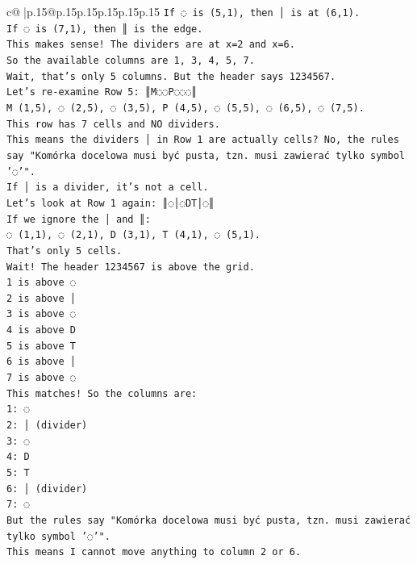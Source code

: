 \documentclass{article}
\begin{document}
{\begin{supertabular}{c@{$\;$}|p{.15\linewidth}@{}p{.15\linewidth}p{.15\linewidth}p{.15\linewidth}p{.15\linewidth}p{.15\linewidth}}
{{{\texttt{If ◌ is (5,1), then │ is at (6,1).} \\
\texttt{If ◌ is (7,1), then ║ is the edge.} \\
\texttt{This makes sense! The dividers are at x=2 and x=6.} \\
\texttt{So the available columns are 1, 3, 4, 5, 7.} \\
\texttt{Wait, that's only 5 columns. But the header says 1234567.} \\
\texttt{Let's re{-}examine Row 5: ║M◌◌P◌◌◌║} \\
\texttt{M (1,5), ◌ (2,5), ◌ (3,5), P (4,5), ◌ (5,5), ◌ (6,5), ◌ (7,5).} \\
\texttt{This row has 7 cells and NO dividers.} \\
\texttt{This means the dividers │ in Row 1 are actually cells? No, the rules say "Komórka docelowa musi być pusta, tzn. musi zawierać tylko symbol '◌'".} \\
\texttt{If │ is a divider, it's not a cell.} \\
\texttt{Let's look at Row 1 again: ║◌│◌DT│◌║} \\
\texttt{If we ignore the │ and ║:} \\
\texttt{◌ (1,1), ◌ (2,1), D (3,1), T (4,1), ◌ (5,1).} \\
\texttt{That's only 5 cells.} \\
\texttt{Wait! The header 1234567 is above the grid.} \\
\texttt{1 is above ◌} \\
\texttt{2 is above │} \\
\texttt{3 is above ◌} \\
\texttt{4 is above D} \\
\texttt{5 is above T} \\
\texttt{6 is above │} \\
\texttt{7 is above ◌} \\
\texttt{This matches! So the columns are:} \\
\texttt{1: ◌} \\
\texttt{2: │ (divider)} \\
\texttt{3: ◌} \\
\texttt{4: D} \\
\texttt{5: T} \\
\texttt{6: │ (divider)} \\
\texttt{7: ◌} \\
\texttt{But the rules say "Komórka docelowa musi być pusta, tzn. musi zawierać tylko symbol '◌'".} \\
\texttt{This means I cannot move anything to column 2 or 6.} \\
}}}
\end{supertabular}}
\end{document}
